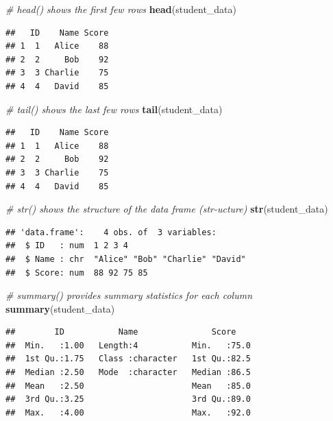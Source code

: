 \documentclass[
  11pt,
]{article}
\newenvironment{Shaded}{\begin{snugshade}}{\end{snugshade}}
\newcommand{\CommentTok}[1]{\textcolor[rgb]{0.56,0.35,0.01}{\textit{#1}}}
\newcommand{\FunctionTok}[1]{\textcolor[rgb]{0.13,0.29,0.53}{\textbf{#1}}}
\newcommand{\NormalTok}[1]{#1}
\begin{document}
\begin{Shaded}
\begin{Highlighting}[]
\CommentTok{\# head() shows the first few rows}
\FunctionTok{head}\NormalTok{(student\_data)}
\end{Highlighting}
\end{Shaded}

\begin{verbatim}
##   ID    Name Score
## 1  1   Alice    88
## 2  2     Bob    92
## 3  3 Charlie    75
## 4  4   David    85
\end{verbatim}

\begin{Shaded}
\begin{Highlighting}[]
\CommentTok{\# tail() shows the last few rows}
\FunctionTok{tail}\NormalTok{(student\_data)}
\end{Highlighting}
\end{Shaded}

\begin{verbatim}
##   ID    Name Score
## 1  1   Alice    88
## 2  2     Bob    92
## 3  3 Charlie    75
## 4  4   David    85
\end{verbatim}

\begin{Shaded}
\begin{Highlighting}[]
\CommentTok{\# str() shows the structure of the data frame (str{-}ucture)}
\FunctionTok{str}\NormalTok{(student\_data)}
\end{Highlighting}
\end{Shaded}

\begin{verbatim}
## 'data.frame':    4 obs. of  3 variables:
##  $ ID   : num  1 2 3 4
##  $ Name : chr  "Alice" "Bob" "Charlie" "David"
##  $ Score: num  88 92 75 85
\end{verbatim}

\begin{Shaded}
\begin{Highlighting}[]
\CommentTok{\# summary() provides summary statistics for each column}
\FunctionTok{summary}\NormalTok{(student\_data)}
\end{Highlighting}
\end{Shaded}

\begin{verbatim}
##        ID           Name               Score     
##  Min.   :1.00   Length:4           Min.   :75.0  
##  1st Qu.:1.75   Class :character   1st Qu.:82.5  
##  Median :2.50   Mode  :character   Median :86.5  
##  Mean   :2.50                      Mean   :85.0  
##  3rd Qu.:3.25                      3rd Qu.:89.0  
##  Max.   :4.00                      Max.   :92.0
\end{verbatim}
\end{document}
